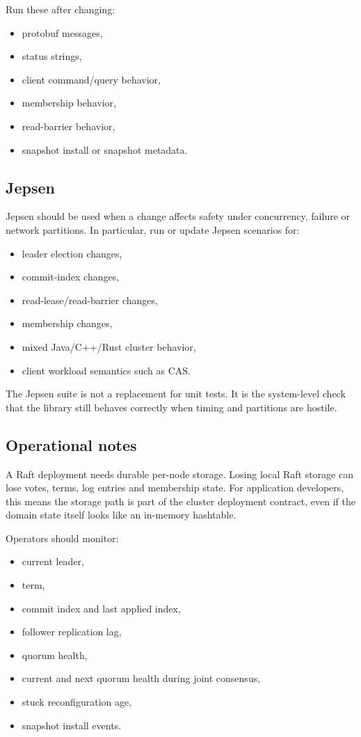 Run these after changing:

\begin{itemize}
\item protobuf messages,
\item status strings,
\item client command/query behavior,
\item membership behavior,
\item read-barrier behavior,
\item snapshot install or snapshot metadata.
\end{itemize}

\subsection{Jepsen}

Jepsen should be used when a change affects safety under concurrency, failure or
network partitions. In particular, run or update Jepsen scenarios for:

\begin{itemize}
\item leader election changes,
\item commit-index changes,
\item read-lease/read-barrier changes,
\item membership changes,
\item mixed Java/C++/Rust cluster behavior,
\item client workload semantics such as CAS.
\end{itemize}

The Jepsen suite is not a replacement for unit tests. It is the system-level
check that the library still behaves correctly when timing and partitions are
hostile.

\subsection{Operational notes}

A Raft deployment needs durable per-node storage. Losing local Raft storage can
lose votes, terms, log entries and membership state. For application developers,
this means the storage path is part of the cluster deployment contract, even if
the domain state itself looks like an in-memory hashtable.

Operators should monitor:

\begin{itemize}
\item current leader,
\item term,
\item commit index and last applied index,
\item follower replication lag,
\item quorum health,
\item current and next quorum health during joint consensus,
\item stuck reconfiguration age,
\item snapshot install events.
\end{itemize}

